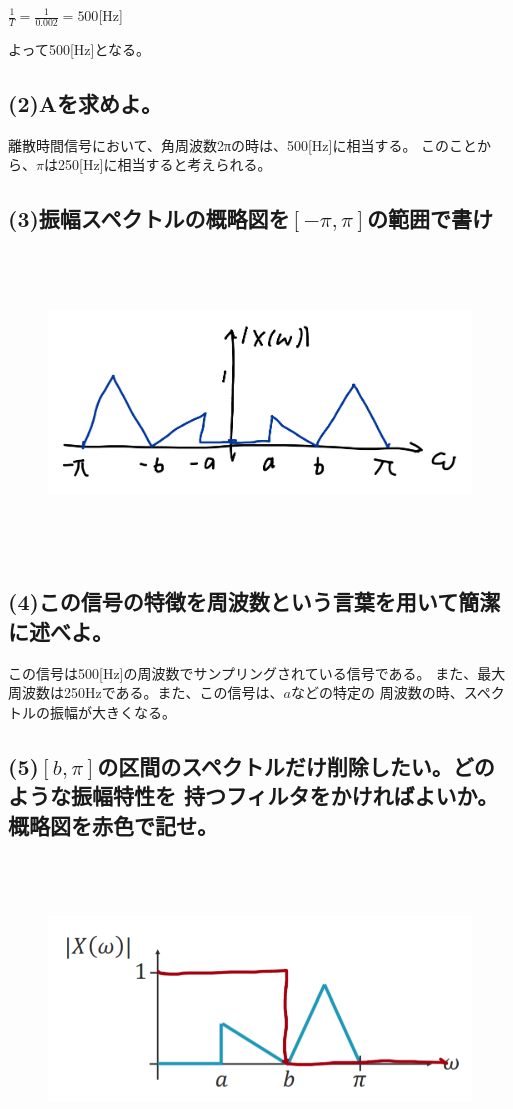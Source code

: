 \documentclass[a4paper,11pt]{ltjsarticle}
\begin{document}
$\frac{1}{T} = \frac{1}{0.002} = 500$[Hz]

よって500[Hz]となる。

\subsection*{(2)Aを求めよ。}
離散時間信号において、角周波数2πの時は、500[Hz]に相当する。
このことから、$\pi$は250[Hz]に相当すると考えられる。

\subsection*{(3)振幅スペクトルの概略図を$[-\pi,\pi]$の範囲で書け}
\begin{figure}[H]
\begin{center}
\includegraphics*[height = 8cm]{DSP1/R2_4_3.png}
\caption{}
\end{center}
\end{figure}

\subsection*{(4)この信号の特徴を周波数という言葉を用いて簡潔に述べよ。}
この信号は500[Hz]の周波数でサンプリングされている信号である。
また、最大周波数は250Hzである。また、この信号は、$a$などの特定の
周波数の時、スペクトルの振幅が大きくなる。

\subsection*{(5)$[b,\pi]$の区間のスペクトルだけ削除したい。どのような振幅特性を
持つフィルタをかければよいか。概略図を赤色で記せ。}
\begin{figure}[H]
\begin{center}
\includegraphics*[height = 8cm]{DSP1/R2_5_5.png}
\caption{}
\end{center}
\end{figure}
\end{document}
